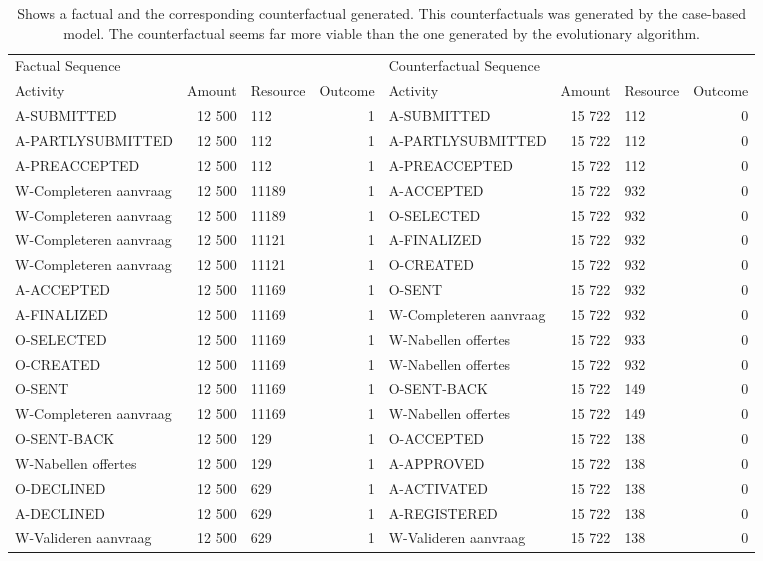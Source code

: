 \begin{table}
\caption{Shows a factual and the corresponding counterfactual generated. This counterfactuals was generated by the case-based model. The counterfactual seems far more viable than the one generated by the evolutionary algorithm.}
\label{tbl:example-cf-cbg}
\begin{tabular}{lrlrlrlr}
\toprule
\multicolumn{4}{l}{Factual Sequence} & \multicolumn{4}{l}{Counterfactual Sequence} \\
Activity & Amount & Resource & Outcome & Activity & Amount & Resource & Outcome \\
\midrule
A-SUBMITTED & 12 500 & 112 & 1 & A-SUBMITTED & 15 722 & 112 & 0 \\
A-PARTLYSUBMITTED & 12 500 & 112 & 1 & A-PARTLYSUBMITTED & 15 722 & 112 & 0 \\
A-PREACCEPTED & 12 500 & 112 & 1 & A-PREACCEPTED & 15 722 & 112 & 0 \\
W-Completeren aanvraag & 12 500 & 11189 & 1 & A-ACCEPTED & 15 722 & 932 & 0 \\
W-Completeren aanvraag & 12 500 & 11189 & 1 & O-SELECTED & 15 722 & 932 & 0 \\
W-Completeren aanvraag & 12 500 & 11121 & 1 & A-FINALIZED & 15 722 & 932 & 0 \\
W-Completeren aanvraag & 12 500 & 11121 & 1 & O-CREATED & 15 722 & 932 & 0 \\
A-ACCEPTED & 12 500 & 11169 & 1 & O-SENT & 15 722 & 932 & 0 \\
A-FINALIZED & 12 500 & 11169 & 1 & W-Completeren aanvraag & 15 722 & 932 & 0 \\
O-SELECTED & 12 500 & 11169 & 1 & W-Nabellen offertes & 15 722 & 933 & 0 \\
O-CREATED & 12 500 & 11169 & 1 & W-Nabellen offertes & 15 722 & 932 & 0 \\
O-SENT & 12 500 & 11169 & 1 & O-SENT-BACK & 15 722 & 149 & 0 \\
W-Completeren aanvraag & 12 500 & 11169 & 1 & W-Nabellen offertes & 15 722 & 149 & 0 \\
O-SENT-BACK & 12 500 & 129 & 1 & O-ACCEPTED & 15 722 & 138 & 0 \\
W-Nabellen offertes & 12 500 & 129 & 1 & A-APPROVED & 15 722 & 138 & 0 \\
O-DECLINED & 12 500 & 629 & 1 & A-ACTIVATED & 15 722 & 138 & 0 \\
A-DECLINED & 12 500 & 629 & 1 & A-REGISTERED & 15 722 & 138 & 0 \\
W-Valideren aanvraag & 12 500 & 629 & 1 & W-Valideren aanvraag & 15 722 & 138 & 0 \\
\bottomrule
\end{tabular}
\end{table}
